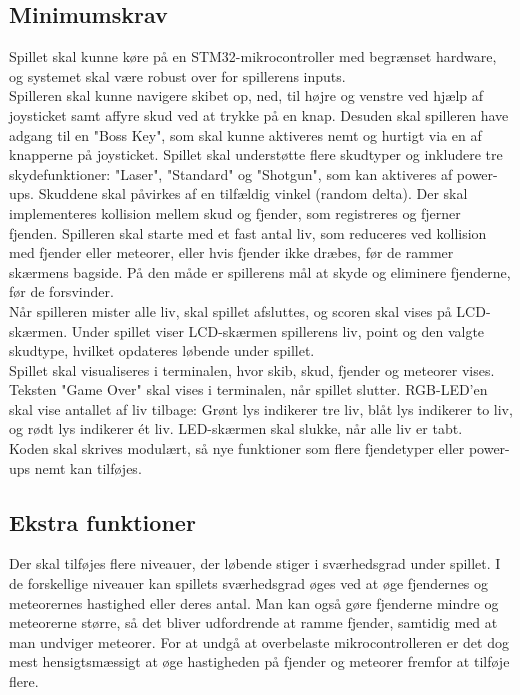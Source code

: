 \subsection{Minimumskrav}
Spillet skal kunne køre på en STM32-mikrocontroller med begrænset hardware, og systemet skal være robust over for spillerens inputs.\\
Spilleren skal kunne navigere skibet op, ned, til højre og venstre ved hjælp af joysticket samt affyre skud ved at trykke på en knap. Desuden skal spilleren have adgang til en "Boss Key", som skal kunne aktiveres nemt og hurtigt via en af knapperne på joysticket. Spillet skal understøtte flere skudtyper og inkludere tre skydefunktioner: "Laser", "Standard" og "Shotgun", som kan aktiveres af power-ups. Skuddene skal påvirkes af en tilfældig vinkel (random delta). Der skal implementeres kollision mellem skud og fjender, som registreres og fjerner fjenden. Spilleren skal starte med et fast antal liv, som reduceres ved kollision med fjender eller meteorer, eller hvis fjender ikke dræbes, før de rammer skærmens bagside. På den måde er spillerens mål at skyde og eliminere fjenderne, før de forsvinder.\\
Når spilleren mister alle liv, skal spillet afsluttes, og scoren skal vises på LCD-skærmen. Under spillet viser LCD-skærmen spillerens liv, point og den valgte skudtype, hvilket opdateres løbende under spillet.\\
Spillet skal visualiseres i terminalen, hvor skib, skud, fjender og meteorer vises. Teksten "Game Over" skal vises i terminalen, når spillet slutter. RGB-LED'en skal vise antallet af liv tilbage: Grønt lys indikerer tre liv, blåt lys indikerer to liv, og rødt lys indikerer ét liv. LED-skærmen skal slukke, når alle liv er tabt.\\
Koden skal skrives modulært, så nye funktioner som flere fjendetyper eller power-ups nemt kan tilføjes.

\subsection*{Ekstra funktioner}
Der skal tilføjes flere niveauer, der løbende stiger i sværhedsgrad under spillet. I de forskellige niveauer kan spillets sværhedsgrad øges ved at øge fjendernes og meteorernes hastighed eller deres antal. Man kan også gøre fjenderne mindre og meteorerne større, så det bliver udfordrende at ramme fjender, samtidig med at man undviger meteorer. For at undgå at overbelaste mikrocontrolleren er det dog mest hensigtsmæssigt at øge hastigheden på fjender og meteorer fremfor at tilføje flere.

